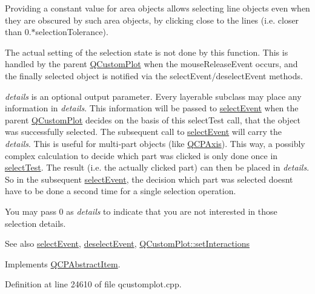 Providing a constant value for area objects allows selecting line objects even when they are obscured by such area objects, by clicking close to the lines (i.\+e. closer than 0.$\ast$selection\+Tolerance).

The actual setting of the selection state is not done by this function. This is handled by the parent \hyperlink{class_q_custom_plot}{Q\+Custom\+Plot} when the mouse\+Release\+Event occurs, and the finally selected object is notified via the select\+Event/deselect\+Event methods.

{\itshape details} is an optional output parameter. Every layerable subclass may place any information in {\itshape details}. This information will be passed to \hyperlink{class_q_c_p_abstract_item_aaf92af7b9893712959a6c073d334d88d}{select\+Event} when the parent \hyperlink{class_q_custom_plot}{Q\+Custom\+Plot} decides on the basis of this select\+Test call, that the object was successfully selected. The subsequent call to \hyperlink{class_q_c_p_abstract_item_aaf92af7b9893712959a6c073d334d88d}{select\+Event} will carry the {\itshape details}. This is useful for multi-\/part objects (like \hyperlink{class_q_c_p_axis}{Q\+C\+P\+Axis}). This way, a possibly complex calculation to decide which part was clicked is only done once in \hyperlink{class_q_c_p_item_rect_af13b0797079b40b73d1c7286b76f18ac}{select\+Test}. The result (i.\+e. the actually clicked part) can then be placed in {\itshape details}. So in the subsequent \hyperlink{class_q_c_p_abstract_item_aaf92af7b9893712959a6c073d334d88d}{select\+Event}, the decision which part was selected doesn\textquotesingle{}t have to be done a second time for a single selection operation.

You may pass 0 as {\itshape details} to indicate that you are not interested in those selection details.

\begin{DoxySeeAlso}{See also}
\hyperlink{class_q_c_p_abstract_item_aaf92af7b9893712959a6c073d334d88d}{select\+Event}, \hyperlink{class_q_c_p_abstract_item_a91f090d6763cfedb0749219c63788ae9}{deselect\+Event}, \hyperlink{class_q_custom_plot_a5ee1e2f6ae27419deca53e75907c27e5}{Q\+Custom\+Plot\+::set\+Interactions} 
\end{DoxySeeAlso}


Implements \hyperlink{class_q_c_p_abstract_item_a96d522d10ffc0413b9a366c6f7f0476b}{Q\+C\+P\+Abstract\+Item}.



Definition at line 24610 of file qcustomplot.\+cpp.



